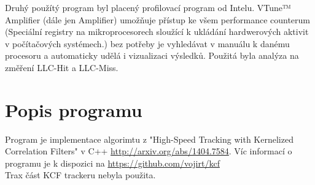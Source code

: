 \documentclass{article}
\begin{document}
Druhý použítý program byl placený profilovací program od Intelu. VTune™ Amplifier (dále jen Amplifier) umožňuje přístup ke všem performance counterum (Speciální registry na mikroprocesorech sloužící k ukládání hardwerových aktivit v počítačových systémech.) bez potřeby je vyhledávat v manuálu k danému procesoru a automaticky udělá i vizualizaci výsledků. Použitá byla analýza na změření LLC-Hit a LLC-Miss.


\section{Popis programu}
Program je implementace algorimtu z "High-Speed Tracking with Kernelized Correlation Filters" v C++ \url{http://arxiv.org/abs/1404.7584}. Víc informací o programu je k dispozici na \url{https://github.com/vojirt/kcf}\\
Trax část KCF trackeru nebyla použita.
\end{document}
